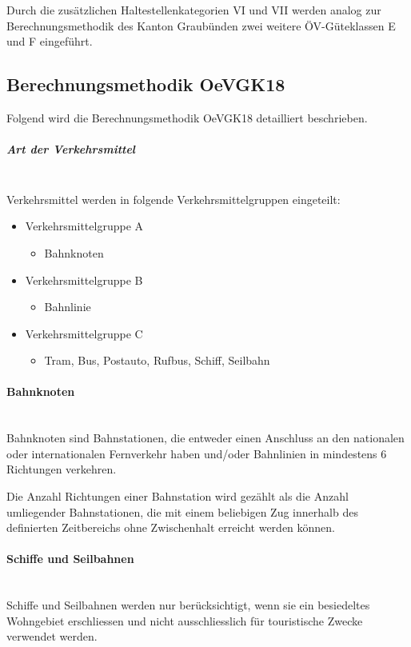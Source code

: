 Durch die zusätzlichen Haltestellenkategorien VI und VII werden analog zur Berechnungsmethodik des Kanton Graubünden zwei weitere ÖV-Güteklassen E und F eingeführt.

\subsection{Berechnungsmethodik OeVGK18}
\label{Berechnungsmethodik OeVGK18}
Folgend wird die Berechnungsmethodik \gls{OeVGK18} detailliert beschrieben.

\subparagraph{Art der Verkehrsmittel}~\\
\label{Berechnungsmethodik OeVGK18:Art der Verkehrsmittel}
Verkehrsmittel werden in folgende Verkehrsmittelgruppen eingeteilt:

\begin{itemize}[noitemsep]
    \item Verkehrsmittelgruppe A
    \begin{itemize}
        \item Bahnknoten
    \end{itemize}
    \item Verkehrsmittelgruppe B
    \begin{itemize}
        \item Bahnlinie
    \end{itemize}
    \item Verkehrsmittelgruppe C
    \begin{itemize}
        \item Tram, Bus, Postauto, Rufbus, Schiff, Seilbahn
    \end{itemize}
\end{itemize}

\paragraph{Bahnknoten}~\\
Bahnknoten sind Bahnstationen, die entweder einen Anschluss an den nationalen oder internationalen Fernverkehr haben und/oder Bahnlinien in mindestens 6 Richtungen verkehren.

Die Anzahl Richtungen einer Bahnstation wird gezählt als die Anzahl umliegender Bahnstationen, die mit einem beliebigen Zug innerhalb des definierten Zeitbereichs ohne Zwischenhalt erreicht werden können.

\paragraph{Schiffe und Seilbahnen}~\\
Schiffe und Seilbahnen werden nur berücksichtigt, wenn sie ein besiedeltes Wohngebiet erschliessen und nicht ausschliesslich für touristische Zwecke verwendet werden.


